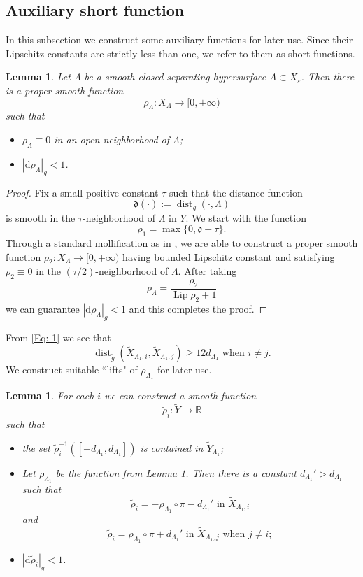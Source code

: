 \documentclass[11pt,letterpaper]{amsart}
\numberwithin{equation}{section}
\newtheorem{lemma}[theorem]{Lemma}
\theoremstyle{definition}
\DeclareMathOperator{\Lip}{Lip}
\DeclareMathOperator{\dist}{dist}
\newcommand{\ve}{\varepsilon}
\newcommand{\ti}[1]{\tilde{#1}}
\begin{document}
\subsection{Auxiliary short function}
In this subsection we construct some auxiliary functions for later use. Since their Lipschitz {constants are} strictly less than one, we refer to them as short functions.
\begin{lemma}\label{Lem: rho lambda}
Let $\Lambda$ be a smooth closed {separating} hypersurface $\Lambda \subset X_\ve$. Then there is a proper smooth function
$$\rho_{\Lambda}:X_{\Lambda} \to [0,+\infty)$$
such that
\begin{itemize}\setlength{\itemsep}{1mm}
\item $\rho_{\Lambda}\equiv 0$ in an open neighborhood of $\Lambda$;
\item $|\mathrm d\rho_{\Lambda}|_g < 1$.
\end{itemize}
\end{lemma}
\begin{proof}
Fix a small positive constant $\tau$ such that the distance function
$$\mathfrak d(\cdot):=\dist_g(\cdot,\Lambda)$$ is smooth in the $\tau$-neighborhood of $\Lambda$ in $Y$. We start with the function
$$
\rho_1=\max\{0,\mathfrak d-\tau\}.
$$
Through a standard mollification as in {\cite{GW79}}, we are able to construct a proper smooth function $\rho_2: X_{\Lambda} \to [0,+\infty)$ having bounded Lipschitz constant and satisfying $\rho_2\equiv 0$ in the $(\tau/2)$-neighborhood of $\Lambda$. After taking $$\rho_{\Lambda}=\frac{\rho_2}{\Lip\rho_2+1}$$ we can guarantee $|\mathrm d\rho_{\Lambda}|_g< 1$
and this completes the proof.
\end{proof}


From \eqref{Eq: 1} we see that
$$
\dist_{\tilde g} (\ti X_{\Lambda_1,i},\ti X_{\Lambda_1,j})\geq 12 d_{\Lambda_1}\mbox{ when } i\neq j.
$$
We construct suitable ``lifts" of $\rho_{\Lambda_1}$ for later use.

\begin{lemma}\label{Lem: rho_i}
For each $i$ we can construct a smooth function
$$
\tilde \rho_i:\tilde Y\to \mathbb R
$$
such that
\begin{itemize}\setlength{\itemsep}{1mm}
\item the set $\tilde \rho_i^{-1}([-d_{\Lambda_1},d_{\Lambda_1}])$ is contained in $\ti Y_{\Lambda_1}$;
\item Let $\rho_{\Lambda_1}$ be the function from Lemma \ref{Lem: rho lambda}. Then there is a constant $d_{\Lambda_1}'>d_{\Lambda_1}$ such that
$$\tilde \rho_i=-\rho_{\Lambda_1}\circ \pi-d_{\Lambda_1}'\mbox{ in } \ti X_{\Lambda_1,i}$$
and
$$\tilde \rho_i=\rho_{\Lambda_1}\circ \pi+d_{\Lambda_1}'\mbox{ in }  \ti X_{\Lambda_1,j} \mbox{ when }j\neq i;$$
\item $|\mathrm d\tilde\rho_i|_{\tilde g}< 1$.
\end{itemize}
\end{lemma}
\end{document}
